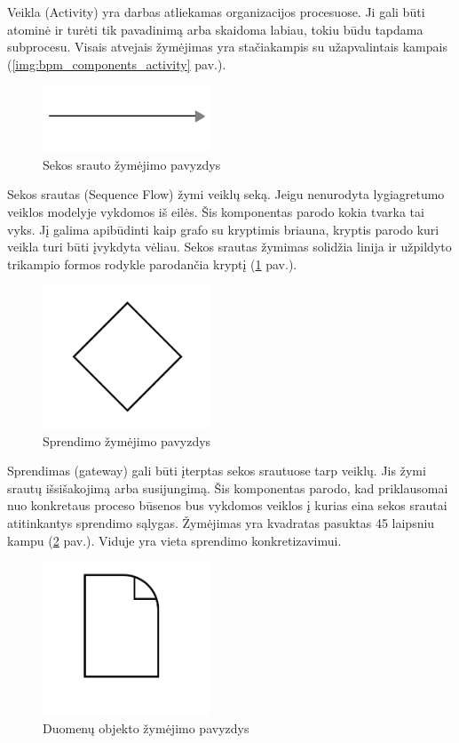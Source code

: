 \documentclass{VUMIFInfBakalaurinis}
\begin{document}
Veikla (Activity) yra darbas atliekamas organizacijos procesuose. Ji gali būti atominė ir turėti tik pavadinimą arba  skaidoma labiau, tokiu būdu tapdama subprocesu. Visais atvejais žymėjimas yra stačiakampis su užapvalintais kampais (\ref{img:bpm_components_activity} pav.).

\begin{figure}[H]
	\centering
	\includegraphics[width=5cm]{img/bpm-components/transition}
	\caption{Sekos srauto žymėjimo pavyzdys}
	\label{img:bpm_components_sequence_flow}
\end{figure}

Sekos srautas (Sequence Flow) žymi veiklų seką. Jeigu nenurodyta lygiagretumo veiklos modelyje vykdomos iš eilės. Šis komponentas parodo kokia tvarka tai vyks. Jį galima apibūdinti kaip grafo su kryptimis briauna, kryptis parodo kuri veikla turi būti įvykdyta vėliau. Sekos srautas žymimas solidžia linija ir užpildyto trikampio formos rodykle parodančia kryptį (\ref{img:bpm_components_sequence_flow} pav.).

\begin{figure}[H]
	\centering
	\includegraphics[width=5cm]{img/bpm-components/gateway}
	\caption{Sprendimo žymėjimo pavyzdys}
	\label{img:bpm_components_gateway}
\end{figure}

Sprendimas (gateway) gali būti įterptas sekos srautuose tarp veiklų. Jis žymi srautų išsišakojimą arba susijungimą. Šis komponentas parodo, kad priklausomai nuo konkretaus proceso būsenos bus vykdomos veiklos į kurias eina sekos srautai atitinkantys sprendimo sąlygas. Žymėjimas yra kvadratas pasuktas 45 laipsniu kampu (\ref{img:bpm_components_gateway} pav.). Viduje yra vieta sprendimo konkretizavimui.

\begin{figure}[H]
	\centering
	\includegraphics[width=5cm]{img/bpm-components/data_object}
	\caption{Duomenų objekto žymėjimo pavyzdys}
	\label{img:bpm_components_data_object}
\end{figure}
\end{document}
